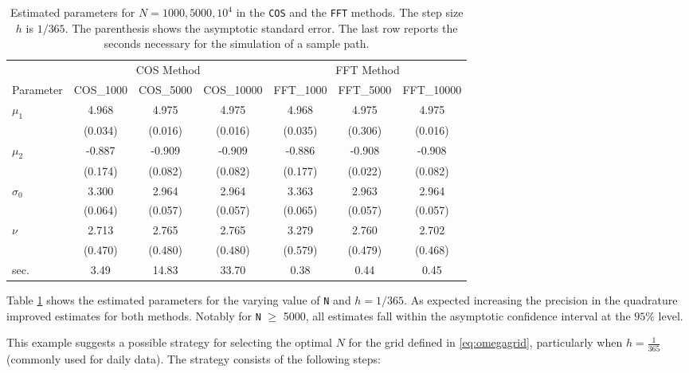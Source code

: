 \begin{table}[!h]
\centering
\caption{\label{tab:Comph365}Estimated parameters for $N = 1000, 5000, 10^4$ in the \texttt{COS} and the \texttt{FFT} methods. The step size $h$ is $1/365$. The parenthesis shows the asymptotic standard error. The last row reports the seconds necessary for the simulation of a sample path.}
\centering
\begin{tabular}[t]{lcccccc}
\toprule
\multicolumn{1}{c}{ } & \multicolumn{3}{c}{COS Method} & \multicolumn{3}{c}{FFT Method} \\
\cmidrule(l{3pt}r{3pt}){2-4} \cmidrule(l{3pt}r{3pt}){5-7}
Parameter & COS\_1000 & COS\_5000 & COS\_10000 & FFT\_1000 & FFT\_5000 & FFT\_10000\\
\midrule
$\mu_1$ & 4.968 & 4.975 & 4.975 & 4.968 & 4.975 & 4.975\\
 & (0.034) & (0.016) & (0.016) & (0.035) & (0.306) & (0.016)\\
$\mu_2$ & -0.887 & -0.909 & -0.909 & -0.886 & -0.908 & -0.908\\
 & (0.174) & (0.082) & (0.082) & (0.177) & (0.022) & (0.082)\\
$\sigma_0$ & 3.300 & 2.964 & 2.964 & 3.363 & 2.963 & 2.964\\
\addlinespace
 & (0.064) & (0.057) & (0.057) & (0.065) & (0.057) & (0.057)\\
$\nu$ & 2.713 & 2.765 & 2.765 & 3.279 & 2.760 & 2.702\\
 & (0.470) & (0.480) & (0.480) & (0.579) & (0.479) & (0.468)\\
sec. & 3.49 & 14.83 & 33.70 & 0.38 & 0.44 & 0.45\\
\bottomrule
\end{tabular}
\end{table}

Table \ref{tab:Comph365} shows the estimated parameters for the varying value of \texttt{N} and \(h=1/365\). As expected increasing the precision in the quadrature improved estimates for both methods. Notably for \texttt{N} \(\geq\) 5000, all estimates fall within the asymptotic confidence interval at the \(95\%\) level.

This example suggests a possible strategy for selecting the optimal \(N\) for the grid defined in \eqref{eq:omegagrid}, particularly when
\(h=\frac{1}{365}\) (commonly used for daily data). The strategy consists of the following steps:

